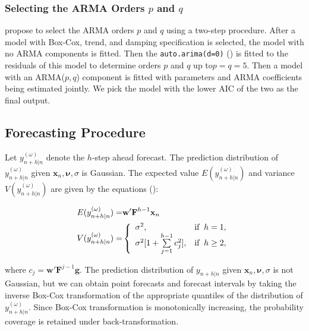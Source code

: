 \documentclass{uwstat572}
\begin{document}
\subsubsection{Selecting the ARMA Orders $p$ and $q$}
\hspace{4ex}\citet{de2011forecasting} propose to select the ARMA orders $p$ and $q$ using a two-step procedure. After a model with Box-Cox, trend, and damping specification is selected, the model with no ARMA components is fitted. Then the \texttt{auto.arima(d=0)} (\citet{hyndman2008automatic}) is fitted to the residuals of this model to determine orders $p$ and $q$ up to$p=q=5$. Then a model with an ARMA($p,q$) component is fitted with parameters and ARMA coefficients being estimated jointly. We pick the model with the lower AIC of the two as the final output. 

\subsection{Forecasting Procedure}
\hspace{4ex}Let $y_{n+h|n}^{(\omega)}$ denote the $h$-step ahead forecast. The prediction distribution of $y_{n+h|n}^{(\omega)}$ given $\textbf{x}_n,\bm{\nu},\sigma$ is Gaussian. The expected value $E(y_{n+h|n}^{(\omega)})$ and variance $V(y_{n+h|n}^{(\omega)})$ are given by the equations (\citet{hyndman2005prediction}):

\begin{subequations}
\begin{align}
E(y_{n+h|n}^{(\omega)})=& \textbf{w}'\textbf{F}^{h-1} \textbf{x}_n \\
V(y_{n+h|n}^{(\omega)}) = &\left\{
\begin{array}{l l}
\sigma^2, & $if$ \;\; h =1,\\
\sigma^2 \lbrack 1+\sum\limits_{j=1}^{h-1} c_j^2  \rbrack, & $if$\;\; h \geq2,\\
\end{array} \right.
\end{align}
\label{eqn:forecast}
\end{subequations}

\noindent where $c_j=\textbf{w}'\textbf{F}^{j-1} \textbf{g}$. The prediction distribution of $y_{n+h|n}$ given $\textbf{x}_n,\bm{\nu},\sigma$ is not Gaussian, but we can obtain point forecasts and forecast intervals by taking the inverse Box-Cox transformation of the appropriate quantiles of the distribution of $y_{n+h|n}^{(\omega)}$. Since Box-Cox transformation is monotonically increasing, the probability coverage is retained under back-transformation. 
\end{document}

